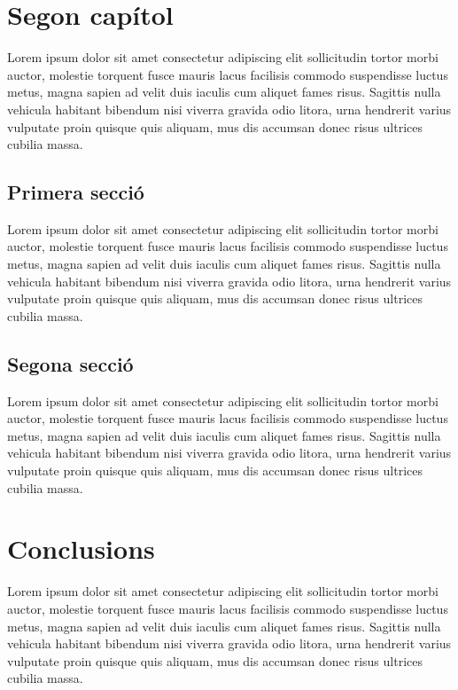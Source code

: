 \documentclass{uathesis-va}
\begin{document}

\chapter{Segon capítol}

Lorem ipsum dolor sit amet consectetur adipiscing elit sollicitudin tortor morbi auctor, molestie torquent fusce mauris lacus facilisis commodo suspendisse luctus metus, magna sapien ad velit duis iaculis cum aliquet fames risus. Sagittis nulla vehicula habitant bibendum nisi viverra gravida odio litora, urna hendrerit varius vulputate proin quisque quis aliquam, mus dis accumsan donec risus ultrices cubilia massa.

\section{Primera secció}

Lorem ipsum dolor sit amet consectetur adipiscing elit sollicitudin tortor morbi auctor, molestie torquent fusce mauris lacus facilisis commodo suspendisse luctus metus, magna sapien ad velit duis iaculis cum aliquet fames risus. Sagittis nulla vehicula habitant bibendum nisi viverra gravida odio litora, urna hendrerit varius vulputate proin quisque quis aliquam, mus dis accumsan donec risus ultrices cubilia massa.

\section{Segona secció}

Lorem ipsum dolor sit amet consectetur adipiscing elit sollicitudin tortor morbi auctor, molestie torquent fusce mauris lacus facilisis commodo suspendisse luctus metus, magna sapien ad velit duis iaculis cum aliquet fames risus. Sagittis nulla vehicula habitant bibendum nisi viverra gravida odio litora, urna hendrerit varius vulputate proin quisque quis aliquam, mus dis accumsan donec risus ultrices cubilia massa.


\chapter{Conclusions}

Lorem ipsum dolor sit amet consectetur adipiscing elit sollicitudin tortor morbi auctor, molestie torquent fusce mauris lacus facilisis commodo suspendisse luctus metus, magna sapien ad velit duis iaculis cum aliquet fames risus. Sagittis nulla vehicula habitant bibendum nisi viverra gravida odio litora, urna hendrerit varius vulputate proin quisque quis aliquam, mus dis accumsan donec risus ultrices cubilia massa.




\end{document}
